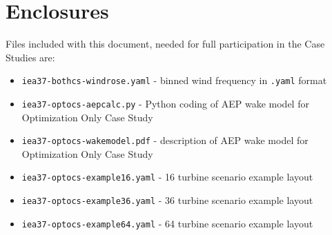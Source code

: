 \documentclass{article}
\begin{document}
\section{Enclosures}
    Files included with this document, needed for full participation in the Case Studies are:

    \begin{itemize}[noitemsep,topsep=0pt,parsep=0pt,partopsep=0pt]
        \item \texttt{iea37-bothcs-windrose.yaml} - binned wind frequency in \texttt{.yaml} format
        \item \texttt{iea37-optocs-aepcalc.py} - Python coding of AEP wake model for Optimization Only Case Study
        \item \texttt{iea37-optocs-wakemodel.pdf} - description of AEP wake model for Optimization Only Case Study
        \item \texttt{iea37-optocs-example16.yaml} - 16 turbine scenario example layout
        \item \texttt{iea37-optocs-example36.yaml} - 36 turbine scenario example layout
        \item \texttt{iea37-optocs-example64.yaml} - 64 turbine scenario example layout
    \end{itemize}

\newpage


\end{document}
